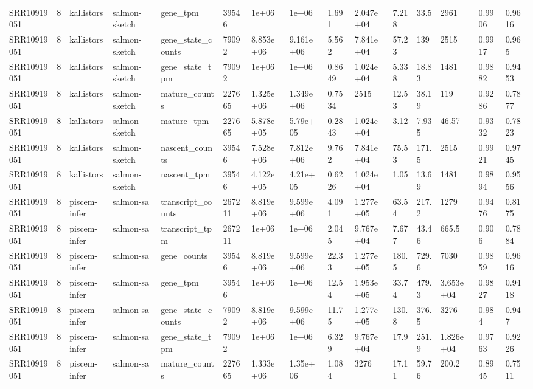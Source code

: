 \begin{tabular}{lllllllllllllll}
SRR10919051 & 8 & kallistors & salmon-sketch & gene\_tpm & 39546 & 1e+06 & 1e+06 & 1.691 & 2.047e+04 & 7.218 & 33.5 & 2961 & 0.9906 & 0.9616 \\
SRR10919051 & 8 & kallistors & salmon-sketch & gene\_state\_counts & 79092 & 8.853e+06 & 9.161e+06 & 5.562 & 7.841e+04 & 57.23 & 139 & 2515 & 0.9917 & 0.965 \\
SRR10919051 & 8 & kallistors & salmon-sketch & gene\_state\_tpm & 79092 & 1e+06 & 1e+06 & 0.8649 & 1.024e+04 & 5.338 & 18.83 & 1481 & 0.9882 & 0.9453 \\
SRR10919051 & 8 & kallistors & salmon-sketch & mature\_counts & 227665 & 1.325e+06 & 1.349e+06 & 0.7534 & 2515 & 12.53 & 38.19 & 119 & 0.9286 & 0.7877 \\
SRR10919051 & 8 & kallistors & salmon-sketch & mature\_tpm & 227665 & 5.878e+05 & 5.79e+05 & 0.2843 & 1.024e+04 & 3.12 & 7.935 & 46.57 & 0.9332 & 0.7823 \\
SRR10919051 & 8 & kallistors & salmon-sketch & nascent\_counts & 39546 & 7.528e+06 & 7.812e+06 & 9.762 & 7.841e+04 & 75.53 & 171.5 & 2515 & 0.9921 & 0.9745 \\
SRR10919051 & 8 & kallistors & salmon-sketch & nascent\_tpm & 39546 & 4.122e+05 & 4.21e+05 & 0.6226 & 1.024e+04 & 1.05 & 13.69 & 1481 & 0.9894 & 0.9556 \\
SRR10919051 & 8 & piscem-infer & salmon-sa & transcript\_counts & 267211 & 8.819e+06 & 9.599e+06 & 4.091 & 1.277e+05 & 63.54 & 217.2 & 1279 & 0.9476 & 0.8175 \\
SRR10919051 & 8 & piscem-infer & salmon-sa & transcript\_tpm & 267211 & 1e+06 & 1e+06 & 2.045 & 9.767e+04 & 7.677 & 43.46 & 665.5 & 0.906 & 0.7884 \\
SRR10919051 & 8 & piscem-infer & salmon-sa & gene\_counts & 39546 & 8.819e+06 & 9.599e+06 & 22.33 & 1.277e+05 & 180.5 & 729.6 & 7030 & 0.9859 & 0.9616 \\
SRR10919051 & 8 & piscem-infer & salmon-sa & gene\_tpm & 39546 & 1e+06 & 1e+06 & 12.54 & 1.953e+05 & 33.74 & 479.3 & 3.653e+04 & 0.9827 & 0.9418 \\
SRR10919051 & 8 & piscem-infer & salmon-sa & gene\_state\_counts & 79092 & 8.819e+06 & 9.599e+06 & 11.75 & 1.277e+05 & 130.8 & 376.5 & 3276 & 0.984 & 0.947 \\
SRR10919051 & 8 & piscem-infer & salmon-sa & gene\_state\_tpm & 79092 & 1e+06 & 1e+06 & 6.329 & 9.767e+04 & 17.9 & 251.9 & 1.826e+04 & 0.9763 & 0.9226 \\
SRR10919051 & 8 & piscem-infer & salmon-sa & mature\_counts & 227665 & 1.333e+06 & 1.35e+06 & 1.084 & 3276 & 17.11 & 59.76 & 200.2 & 0.8945 & 0.7511 \\

\end{tabular}
